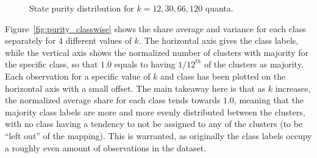 			\begin{figure}[ht]
				\centering
				\caption[State purity distributions in the EMA evaluation]{State purity distribution for $k=12, 30, 66, 120$ quanta.}
				\label{fig:purity_dist}%
			\end{figure}
		
			Figure~\ref{fig:purity_classwise} shows the share average and variance for each class separately for $4$ different values of $k$.
			The horizontal axis gives the class labels, while the vertical axis shows the normalized number of clusters with majority for the specific class, so that $1.0$ equals to having ${1/12}^{th}$ of the clusters as majority.
			Each observation for a specific value of $k$ and class has been plotted on the horizontal axis with a small offset.
			The main takeaway here is that as $k$ increases, the normalized average share for each class tends towards $1.0$, meaning that the majority class labels are more and more evenly distributed between the clusters, with no class having a tendency to not be assigned to any of the clusters (to be ``left out'' of the mapping).
			This is warranted, as originally the class labels occupy a roughly even amount of observations in the dataset.
			
